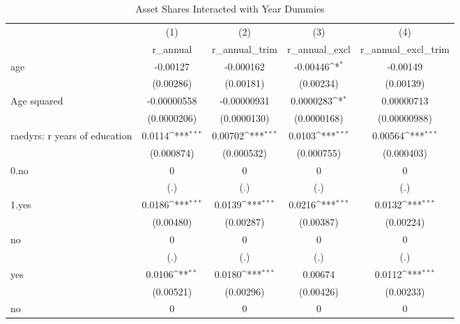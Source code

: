 \begin{table}[htbp]\centering
\def\sym#1{\ifmmode^{#1}\else\(^{#1}\)\fi}
\caption{Asset Shares Interacted with Year Dummies}
\begin{tabular}{l*{4}{c}}
\toprule
                &\multicolumn{1}{c}{(1)}&\multicolumn{1}{c}{(2)}&\multicolumn{1}{c}{(3)}&\multicolumn{1}{c}{(4)}\\
                &\multicolumn{1}{c}{r\_annual}&\multicolumn{1}{c}{r\_annual\_trim}&\multicolumn{1}{c}{r\_annual\_excl}&\multicolumn{1}{c}{r\_annual\_excl\_trim}\\
\midrule
age             & -0.00127         &-0.000162         & -0.00446\sym{*}  & -0.00149         \\
                &(0.00286)         &(0.00181)         &(0.00234)         &(0.00139)         \\
Age squared     &-0.00000558         &-0.00000931         &0.0000283\sym{*}  &0.00000713         \\
                &(0.0000206)         &(0.0000130)         &(0.0000168)         &(0.00000988)         \\
raedyrs: r years of education&   0.0114\sym{***}&  0.00702\sym{***}&   0.0103\sym{***}&  0.00564\sym{***}\\
                &(0.000874)         &(0.000532)         &(0.000755)         &(0.000403)         \\
0.no            &        0         &        0         &        0         &        0         \\
                &      (.)         &      (.)         &      (.)         &      (.)         \\
1.yes           &   0.0186\sym{***}&   0.0139\sym{***}&   0.0216\sym{***}&   0.0132\sym{***}\\
                &(0.00480)         &(0.00287)         &(0.00387)         &(0.00224)         \\
no              &        0         &        0         &        0         &        0         \\
                &      (.)         &      (.)         &      (.)         &      (.)         \\
yes             &   0.0106\sym{**} &   0.0180\sym{***}&  0.00674         &   0.0112\sym{***}\\
                &(0.00521)         &(0.00296)         &(0.00426)         &(0.00233)         \\
no              &        0         &        0         &        0         &        0         \\

\end{tabular}
\end{table}
